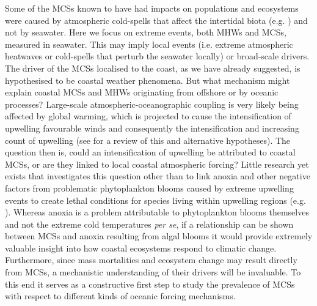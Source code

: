 \documentclass[a4paper,10pt,review]{elsarticle}
\begin{document}
Some of the MCSs known to have had impacts on populations and ecosystems were caused by atmospheric cold-spells that affect the intertidal biota (e.g. \cite{Gunter1941, Firth2011}) and not by seawater. Here we focus on extreme events, both MHWs and MCSs, measured in seawater. This may imply local events (i.e. extreme atmospheric heatwaves or cold-spells that perturb the seawater locally) or broad-scale drivers. The driver of the MCSs localised to the coast, as we have already suggested, is hypothesised to be coastal weather phenomena. But what mechanism might explain coastal MCSs and MHWs originating from offshore or by oceanic processes? Large-scale atmospheric-oceanographic coupling is very likely being affected by global warming, which is projected to cause the intensification of upwelling favourable winds and consequently the intensification and increasing count of upwelling (see \citet{Garcia-Reyes2015} for a review of this and alternative hypotheses). The question then is, could an intensification of upwelling be attributed to coastal MCSs, or are they linked to local coastal atmospheric forcing? Little research yet exists that investigates this question other than to link anoxia and other negative factors from problematic phytoplankton blooms caused by extreme upwelling events to create lethal conditions for species living within upwelling regions (e.g. \cite{Laboy-nieves2001}). Whereas anoxia is a problem attributable to phytoplankton blooms themselves \citep{Diaz2008} and not the extreme cold temperatures \textit{per se}, if a relationship can be shown between MCSs and anoxia resulting from algal blooms it would provide extremely valuable insight into how coastal ecosystems respond to climatic change. Furthermore, since mass mortalities and ecosystem change may result directly from MCSs, a mechanistic understanding of their drivers will be invaluable. To this end it serves as a constructive first step to study the prevalence of MCSs with respect to different kinds of oceanic forcing mechanisms.
\end{document}
